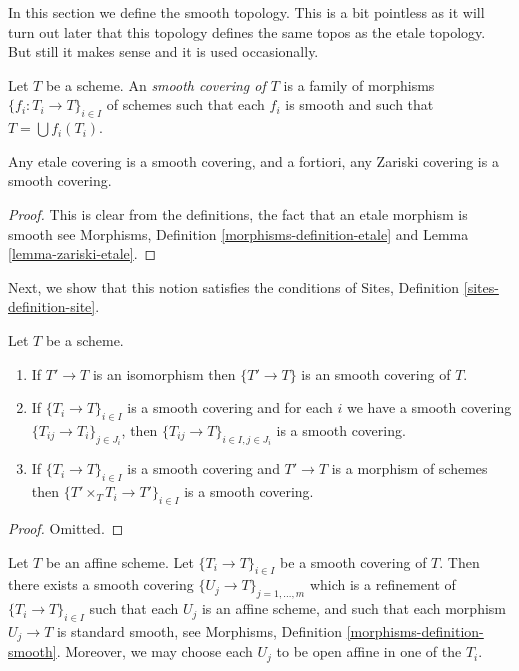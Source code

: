 \noindent
In this section we define the smooth topology.
This is a bit pointless as it will turn out later
that this topology defines the same topos as the
etale topology. But still it makes sense and it is used
occasionally.

\begin{definition}
\label{definition-smooth-covering}
Let $T$ be a scheme. An {\it smooth covering of $T$} is a family
of morphisms $\{f_i : T_i \to T\}_{i \in I}$ of schemes
such that each $f_i$ is smooth and such
that $T = \bigcup f_i(T_i)$.
\end{definition}

\begin{lemma}
\label{lemma-zariski-etale-smooth}
Any etale covering is a smooth covering, and a fortiori,
any Zariski covering is a smooth covering.
\end{lemma}

\begin{proof}
This is clear from the definitions, the fact that an etale morphism is
smooth see
Morphisms, Definition \ref{morphisms-definition-etale}
and Lemma \ref{lemma-zariski-etale}.
\end{proof}

\noindent
Next, we show that this notion satisfies the conditions of
Sites, Definition \ref{sites-definition-site}.

\begin{lemma}
\label{lemma-smooth}
Let $T$ be a scheme.
\begin{enumerate}
\item If $T' \to T$ is an isomorphism then $\{T' \to T\}$
is an smooth covering of $T$.
\item If $\{T_i \to T\}_{i\in I}$ is a smooth covering and for each
$i$ we have a smooth covering $\{T_{ij} \to T_i\}_{j\in J_i}$, then
$\{T_{ij} \to T\}_{i \in I, j\in J_i}$ is a smooth covering.
\item If $\{T_i \to T\}_{i\in I}$ is a smooth covering
and $T' \to T$ is a morphism of schemes then
$\{T' \times_T T_i \to T'\}_{i\in I}$ is a smooth covering.
\end{enumerate}
\end{lemma}

\begin{proof}
Omitted.
\end{proof}

\begin{lemma}
\label{lemma-smooth-affine}
Let $T$ be an affine scheme.
Let $\{T_i \to T\}_{i \in I}$ be a smooth covering of $T$.
Then there exists a smooth covering
$\{U_j \to T\}_{j = 1, \ldots, m}$ which is a refinement
of $\{T_i \to T\}_{i \in I}$ such that each $U_j$ is an affine
scheme, and such that each morphism $U_j \to T$ is standard
smooth, see Morphisms, Definition \ref{morphisms-definition-smooth}.
Moreover, we may choose each $U_j$ to be open affine in one of the $T_i$.
\end{lemma}

